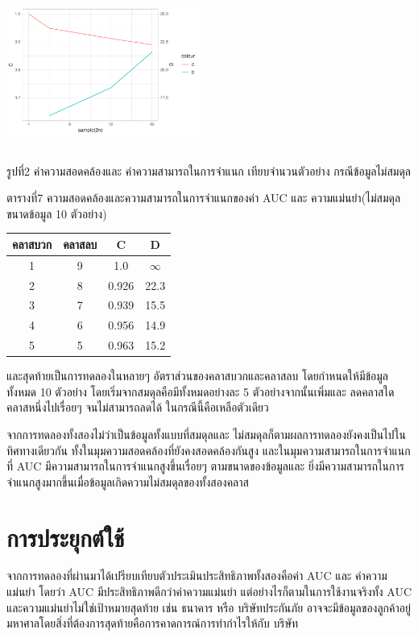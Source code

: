 \documentclass[twoside, twocolumn, 12pt]{article}
\begin{document}
\includegraphics[height=2in,width=2.5in]{pic/Rplot02.pdf}
\begin{center} รูปที่2 ค่าความสอดคล้องและ ค่าความสามารถในการจำแนก เทียบจำนวนตัวอย่าง กรณีข้อมูลไม่สมดุล\end{center}
\begin{center} ตารางที่7 ความสอดคล้องและความสามารถในการจำแนกของค่า AUC และ ความแม่นยำ(ไม่สมดุล ขนาดข้อมูล 10 ตัวอย่าง) \end{center}
\begin{center}
\begin{tabular}{cccc}
\hline
คลาสบวก & คลาสลบ & C & D\\
\hline
1&9&1.0 &$\infty$\\\hline
2&8&0.926&22.3\\\hline
3&7&0.939&15.5\\\hline
4&6&0.956&14.9\\\hline
5&5&0.963&15.2\\\hline
\end{tabular}
\end{center}

และสุดท้ายเป็นการทดลองในหลายๆ อัตราส่วนของคลาสบวกและคลาสลบ โดยกำหนดให้มีข้อมูลทั้งหมด 10 ตัวอย่าง โดยเริ่มจากสมดุลคือมีทั้งหมดอย่างละ 5 ตัวอย่างจากนั้นเพิ่มและ ลดคลาสใดคลาสหนึ่งไปเรื่อยๆ จนไม่สามารถลดได้ ในกรณีนี้คือเหลือตัวเดียว

จากการทดลองทั้งสองไม่ว่าเป็นข้อมูลทั้งแบบที่สมดุลและ ไม่สมดุลก็ตามผลการทดลองยังคงเป็นไปในทิศทางเดียวกัน ทั้งในมุมความสอดคล้องที่ยังคงสอดคล้องกันสูง และในมุมความสามารถในการจำแนกที่ AUC มีความสามารถในการจำแนกสูงขึ้นเรื่อยๆ ตามขนาดของข้อมูลและ ยิ่งมีความสามารถในการจำแนกสูงมากขึ้นเมื่อข้อมูลเกิดความไม่สมดุลของทั้งสองคลาส


\section{การประยุกต์ใช้}
\quad จากการทดลองที่ผ่านมาได้เปรียบเทียบตัวประเมินประสิทธิภาพทั้งสองคือค่า AUC และ ค่าความแม่นยำ โดยว่า AUC มีประสิทธิภาพดีกว่าค่าความแม่นยำ แต่อย่างไรก็ตามในการใช้งานจริงทั้ง AUC และความแม่นยำไม่ใช่เป้าหมายสุดท้าย เช่น  ธนาคาร หรือ บริษัทประกันภัย อาจจะมีข้อมูลของลูกค้าอยู่มหาศาลโดยสิ่งที่ต้องการสุดท้ายคือการคาดการณ์การทำกำไรให้กับ บริษัท
\end{document}
